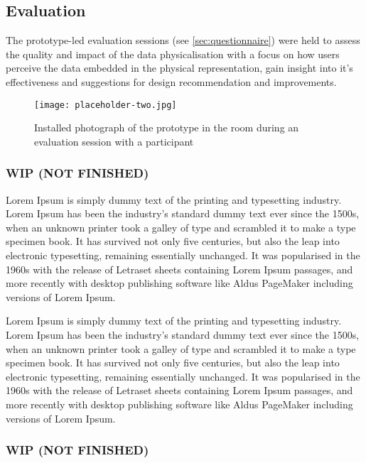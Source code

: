 \subsection{Evaluation}
\label{sec:evaluation_results}

The prototype-led evaluation sessions (see \ref{sec:questionnaire}) were held to assess the quality and impact of the data physicalisation with a focus on how users perceive the data embedded in the physical representation, gain insight into it's effectiveness and suggestions for design recommendation and improvements.

\begin{figure}[b]
    \centering
    \texttt{[image: placeholder-two.jpg]}
    \caption{Installed photograph of the prototype in the room during an evaluation session with a participant }
    \label{fig:complexity}
\end{figure}


\subsubsection{WIP (NOT FINISHED)}

Lorem Ipsum is simply dummy text of the printing and typesetting industry. Lorem Ipsum has been the industry's standard dummy text ever since the 1500s, when an unknown printer took a galley of type and scrambled it to make a type specimen book. It has survived not only five centuries, but also the leap into electronic typesetting, remaining essentially unchanged. It was popularised in the 1960s with the release of Letraset sheets containing Lorem Ipsum passages, and more recently with desktop publishing software like Aldus PageMaker including versions of Lorem Ipsum.

Lorem Ipsum is simply dummy text of the printing and typesetting industry. Lorem Ipsum has been the industry's standard dummy text ever since the 1500s, when an unknown printer took a galley of type and scrambled it to make a type specimen book. It has survived not only five centuries, but also the leap into electronic typesetting, remaining essentially unchanged. It was popularised in the 1960s with the release of Letraset sheets containing Lorem Ipsum passages, and more recently with desktop publishing software like Aldus PageMaker including versions of Lorem Ipsum.


\subsubsection{WIP (NOT FINISHED)}


